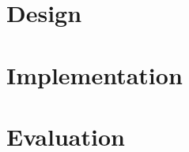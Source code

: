 \section{Design}
\section{Implementation}
\section{Evaluation}
\begin{comment}
SLR
Analysis of other resources
--> ends with requirements
(how good/bad the solution is)
-quantitative and qualitative evaluation, e.g. Laufzeit und Interviews 
- say what is not in scope
-DO NOT describe some agile method for the sake of having it! Just say it is a rather agile method etc.

I. Systematic literature review according to vom Brocke, Cooper and Webster: 
    1. Definition of Scope
        - classification, examples, challenges and evaluation methods of zero knowledge proof protocols 
        
    2. Conceptualization
        - work with concept map
        - derive at a search string
        
    3. Literature Search and Selection
        - look for review paper first to get good overview about the topic
        a) exclude paper that are too old and have too few citations and/or low impact factor (e.g. 5.5 is high)
        b) exclusion acc. to title and keywords
        c) exclusion acc. to abstract & structure of paper & RQ
        c) exclusion acc. to full text & availability of resource
        
    4. Synthesizing of Literature
        - cluster definitions, examples, drawbacks and evaluation methods (first suggestion can be found in the preliminary agenda)
        - write overview section about ZKP (Chapter 4)
- - - - - - -
How to know if a paper is useful for me?
1.title 2.keywords 3.abstract 4.structure of the paper 5.examples/use cases 6.research question/formal problem definition
- - - - - - -
II. Design Science Research
- DSR method acc. to Peffers and Hevner

\end{comment}
\begin{comment}
2) Ziel der Arbeit, scope of work
- not scope to practically integrate any of the concepts into existing DApp or any other existing system
- welche use cases gibt es f{"u}r ZKPs in RAPADO
- wie k{"o}nnte man diese Umsetzen

4) Ergebnisse skizzieren
- implementation can be a proof of concept, software artifact depends highly on complexity of the use case
\end{comment}